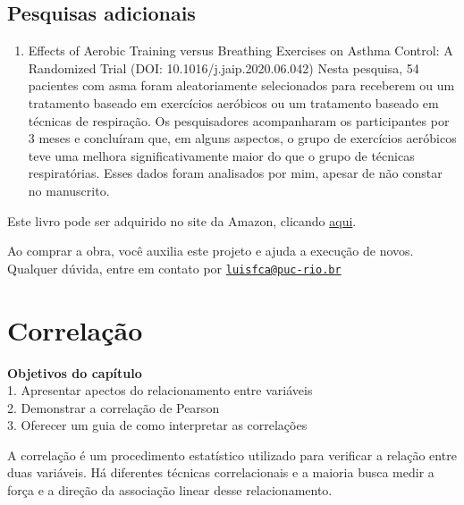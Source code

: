 \documentclass[
]{book}
\providecommand{\tightlist}{%
  \setlength{\itemsep}{0pt}\setlength{\parskip}{0pt}}
\newenvironment{objectives}{
  \definecolor{shadecolor}{rgb}{0, 0, 0}  %
  \color{white}
  \begin{shaded}}
 {\end{shaded}}
\begin{document}
\hypertarget{pesquisas-adicionais-6}{%
\section{Pesquisas adicionais}\label{pesquisas-adicionais-6}}

\begin{enumerate}
\def\labelenumi{\arabic{enumi}.}
\tightlist
\item
  Effects of Aerobic Training versus Breathing Exercises on Asthma Control: A Randomized Trial (DOI: 10.1016/j.jaip.2020.06.042)
  Nesta pesquisa, 54 pacientes com asma foram aleatoriamente selecionados para receberem ou um tratamento baseado em exercícios aeróbicos ou um tratamento baseado em técnicas de respiração. Os pesquisadores acompanharam os participantes por 3 meses e concluíram que, em alguns aspectos, o grupo de exercícios aeróbicos teve uma melhora significativamente maior do que o grupo de técnicas respiratórias. Esses dados foram analisados por mim, apesar de não constar no manuscrito.
\end{enumerate}

Este livro pode ser adquirido no site da Amazon, clicando \href{https://www.amazon.com.br/gp/product/B097CP7T9M?pf_rd_r=RDZC8XYMBC1WY69T0J8K\&pf_rd_p=abb22e6b-8812-4b76-a424-5f0b098d2c90\&pd_rd_r=ceec1911-f409-4acd-ac8f-2d5bc68dac43\&pd_rd_w=wMUzJ\&pd_rd_wg=ZK85a\&ref_=pd_gw_unk}{aqui}.

Ao comprar a obra, você auxilia este projeto e ajuda a execução de novos. Qualquer dúvida, entre em contato por \href{mailto:luisfca@puc-rio.br}{\nolinkurl{luisfca@puc-rio.br}}

\hypertarget{correlauxe7uxe3o}{%
\chapter{Correlação}\label{correlauxe7uxe3o}}

\begin{objectives}
\textbf{Objetivos do capítulo}\\
1. Apresentar apectos do relacionamento entre variáveis\\
2. Demonstrar a correlação de Pearson\\
3. Oferecer um guia de como interpretar as correlações

\end{objectives}

A correlação é um procedimento estatístico utilizado para verificar a relação entre duas variáveis. Há diferentes técnicas correlacionais e a maioria busca medir a força e a direção da associação linear desse relacionamento.
\end{document}
